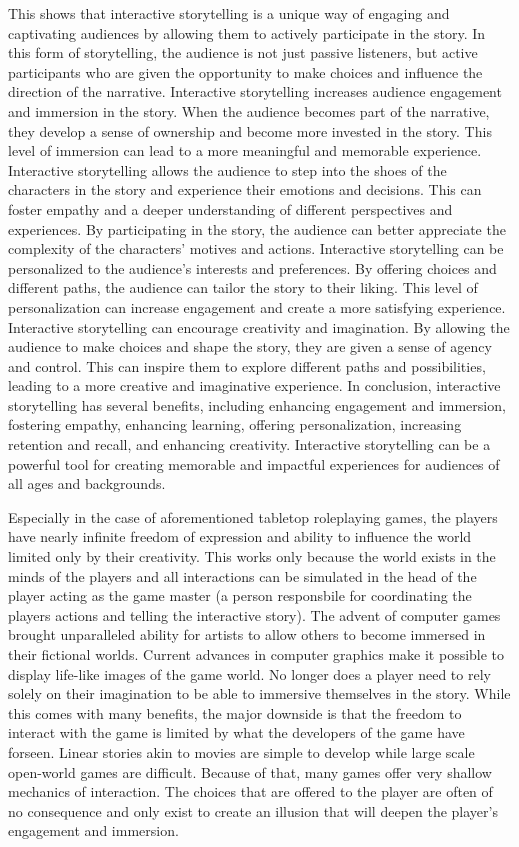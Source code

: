 %
This shows that interactive storytelling is a unique way of engaging and captivating audiences by allowing them to actively participate in the story.
In this form of storytelling, the audience is not just passive listeners, but active participants who are given the opportunity to make choices and influence the direction of the narrative.
Interactive storytelling increases audience engagement and immersion in the story. When the audience becomes part of the narrative, they develop a sense of ownership and become more invested in the story.
This level of immersion can lead to a more meaningful and memorable experience.
Interactive storytelling allows the audience to step into the shoes of the characters in the story and experience their emotions and decisions.
This can foster empathy and a deeper understanding of different perspectives and experiences.
By participating in the story, the audience can better appreciate the complexity of the characters' motives and actions.
Interactive storytelling can be personalized to the audience's interests and preferences.
By offering choices and different paths, the audience can tailor the story to their liking.
This level of personalization can increase engagement and create a more satisfying experience.
Interactive storytelling can encourage creativity and imagination.
By allowing the audience to make choices and shape the story, they are given a sense of agency and control.
This can inspire them to explore different paths and possibilities, leading to a more creative and imaginative experience.
In conclusion, interactive storytelling has several benefits, including enhancing engagement and immersion, fostering empathy, enhancing learning, offering personalization, increasing retention and recall, and enhancing creativity.
Interactive storytelling can be a powerful tool for creating memorable and impactful experiences for audiences of all ages and backgrounds.
%

Especially in the case of aforementioned tabletop roleplaying games, the players have nearly infinite freedom of expression and ability to influence the world limited only by their creativity.
This works only because the world exists in the minds of the players and all interactions can be simulated in the head of the player acting as the game master (a person responsbile for coordinating the players actions and telling the interactive story).
The advent of computer games brought unparalleled ability for artists to allow others to become immersed in their fictional worlds.
Current advances in computer graphics make it possible to display life-like images of the game world.
No longer does a player need to rely solely on their imagination to be able to immersive themselves in the story.
While this comes with many benefits, the major downside is that the freedom to interact with the game is limited by what the developers of the game have forseen.
Linear stories akin to movies are simple to develop while large scale open-world games are difficult.
Because of that, many games offer very shallow mechanics of interaction.
The choices that are offered to the player are often of no consequence and only exist to create an illusion that will deepen the player's engagement and immersion.


